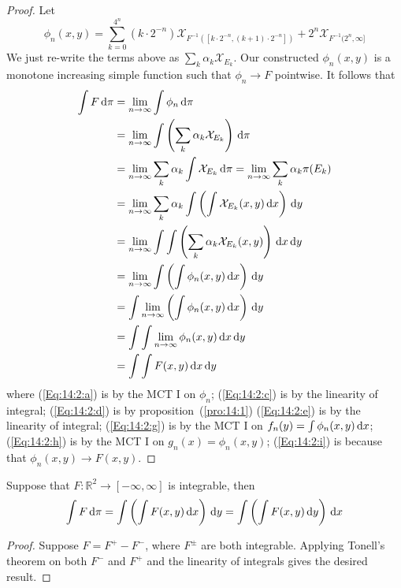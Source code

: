 \begin{proof}
Let
\[
\phi_n(x,y)=\sum_{k=0}^{4^n}(k\cdot 2^{-n})\mathcal{X}_{F^{-1}([k\cdot 2^{-n},(k+1)\cdot 2^{-n}])}
+
2^n\mathcal{X}_{F^{-1}(2^n,\infty]}
\]
We just re-write the terms above as $\sum_k\alpha_k\mathcal{X}_{E_k}$.
Our constructed $\phi_n(x,y)$ is a monotone increasing simple function such that $\phi_n\to F$ pointwise.
It follows that
\begin{subequations}
\begin{align}
\int F\diff\pi
&=
\lim_{n\to\infty}\int\phi_n\diff\pi\label{Eq:14:2:a}\\
&=
\lim_{n\to\infty}\int\left(
\sum_k\alpha_k\mathcal{X}_{E_k}
\right)\diff\pi\\
&=
\lim_{n\to\infty}\sum_k\alpha_k\int\mathcal{X}_{E_k}\diff\pi\label{Eq:14:2:c}=\lim_{n\to\infty}
\sum_k\alpha_k\pi(E_k)\\&
=
\lim_{n\to\infty}\sum_k\alpha_k\int
\left(
\int\mathcal{X}_{E_k}(x,y)\diff x
\right)
\diff y\label{Eq:14:2:d}\\
&=\lim_{n\to\infty}
\int\int\left(\sum_k
\alpha_k\mathcal{X}_{E_k}(x,y)
\right)\diff x\diff y\label{Eq:14:2:e}\\
&=\lim_{n\to\infty}
\int\left(
\int\phi_n(x,y)\diff x
\right)\diff y\\
&=\int \lim_{n\to\infty}
\left(
\int
\phi_n(x,y)\diff x
\right)\diff y\label{Eq:14:2:g}\\
&=\int\int \lim_{n\to\infty}\phi_n(x,y)\diff x\diff y\label{Eq:14:2:h}\\
&=\int \int F(x,y)\diff x\diff y\label{Eq:14:2:i}
\end{align}
\end{subequations}
where (\ref{Eq:14:2:a}) is by the MCT I on $\phi_n$;
(\ref{Eq:14:2:c}) is by the linearity of integral;
(\ref{Eq:14:2:d}) is by proposition~(\ref{pro:14:1})
(\ref{Eq:14:2:e}) is by the linearity of integral;
(\ref{Eq:14:2:g}) is by the MCT I on $f_n(y)=\int \phi_n(x,y)\,\mathrm{d} x$;
(\ref{Eq:14:2:h}) is by the MCT I on $g_n(x)=\phi_n(x,y)$;
(\ref{Eq:14:2:i}) is because that $\phi_n(x,y)\to F(x,y)$.
\end{proof}

\begin{theorem}
Suppose that $F:\mathbb{R}^2\to[-\infty,\infty]$ is integrable, then
\[
\int F\,\mathrm{d}\pi
=
\int\left(
\int F(x,y)\,\mathrm{d} x
\right)\,\mathrm{d} y
=
\int\left(
\int F(x,y)\,\mathrm{d} y
\right)\,\mathrm{d} x
\]
\end{theorem}
\begin{proof}
Suppose $F=F^+-F^-$, where $F^{\pm}$ are both integrable.
Applying Tonell's theorem on both $F^-$ and $F^+$ and the linearity of integrals gives the desired result.
\end{proof}











